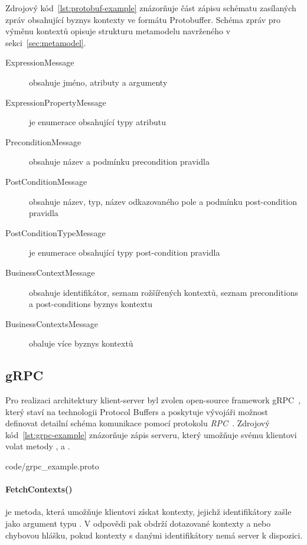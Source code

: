 Zdrojový kód~\ref{lst:protobuf-example} znázorňuje část zápisu schématu
zasílaných zpráv obsahující byznys kontexty ve formátu Protobuffer.
Schéma zpráv pro výměnu kontextů opisuje strukturu metamodelu navrženého
v sekci~\ref{sec:metamodel}.

\begin{description}
    \item [ExpressionMessage] obsahuje jméno, atributy a argumenty 
    \item [ExpressionPropertyMessage] je enumerace obsahující typy atributu 
    \item [PreconditionMessage] obsahuje název a podmínku precondition pravidla
    \item [PostConditionMessage] obsahuje název, typ, název odkazovaného pole a podmínku post-condition pravidla
    \item [PostConditionTypeMessage] je enumerace obsahující typy post-condition pravidla
    \item [BusinessContextMessage] obsahuje identifikátor, seznam rožšířených kontextů, seznam preconditions a post-conditions byznys kontextu
    \item [BusinessContextsMessage] obaluje více byznys kontextů
\end{description}

\subsection{gRPC}

Pro realizaci architektury klient-server byl zvolen
open-source framework gRPC~\cite{grpcio}, který staví
na technologii Protocol Buffers a poskytuje vývojáři
možnost definovat detailní schéma komunikace pomocí
protokolu \textit{RPC}~\cite{nelson1981remote}.
Zdrojový kód~\ref{lst:grpc-example} znázorňuje zápis serveru,
který umožňuje svému klientovi volat metody ,
 a .


{code/grpc_example.proto}

\paragraph{FetchContexts()} je metoda, která umožňuje klientovi
získat kontexty, jejichž identifikátory zašle jako argument
typu .
V odpovědi pak obdrží dotazované kontexty a nebo chybovou hlášku,
pokud kontexty s danými identifikátory nemá server k dispozici.

